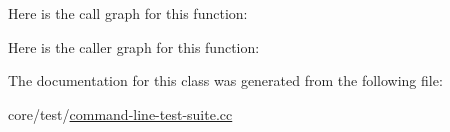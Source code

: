 Here is the call graph for this function\+:




Here is the caller graph for this function\+:




The documentation for this class was generated from the following file\+:\begin{DoxyCompactItemize}
\item 
core/test/\hyperlink{command-line-test-suite_8cc}{command-\/line-\/test-\/suite.\+cc}\end{DoxyCompactItemize}
